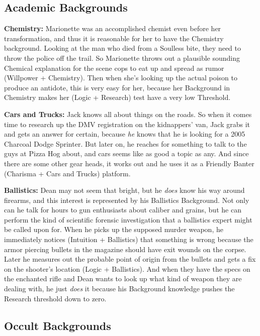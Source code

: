 \subsection{Academic Backgrounds}

\hspace{\parindent} \textbf{Chemistry:} Marionette was an accomplished chemist even before her transformation, and thus it is reasonable for her to have the Chemistry background. Looking at the man who died from a Soulless bite, they need to throw the police off the trail. So Marionette throws out a plausible sounding Chemical explanation for the scene cops to eat up and spread as rumor (Willpower + Chemistry). Then when she's looking up the actual poison to produce an antidote, this is very easy for her, because her Background in Chemistry makes her (Logic + Research) test have a very low Threshold.

\textbf{Cars and Trucks:} Jack knows all about things on the roads. So when it comes time to research up the DMV registration on the kidnappers' van, Jack grabs it and gets an answer for certain, because \textit{he} knows that he is looking for a 2005 Charcoal Dodge Sprinter. But later on, he reaches for something to talk to the guys at Pizza Hog about, and cars seems like as good a topic as any. And since there are some other gear heads, it works out and he uses it as a Friendly Banter (Charisma + Cars and Trucks) platform.

\textbf{Ballistics:} Dean may not seem that bright, but he \textit{does} know his way around firearms, and this interest is represented by his Ballistics Background. Not only can he talk for hours to gun enthusiasts about caliber and grains, but he can perform the kind of scientific forensic investigation that a ballistics expert might be called upon for. When he picks up the supposed murder weapon, he immediately notices (Intuition + Ballistics) that something is wrong because the armor piercing bullets in the magazine should have exit wounds on the corpse. Later he measures out the probable point of origin from the bullets and gets a fix on the shooter's location (Logic + Ballistics). And when they have the specs on the enchanted rifle and Dean wants to look up what kind of weapon they are dealing with, he just \textit{does} it because his Background knowledge pushes the Research threshold down to zero.

\subsection{Occult Backgrounds}

